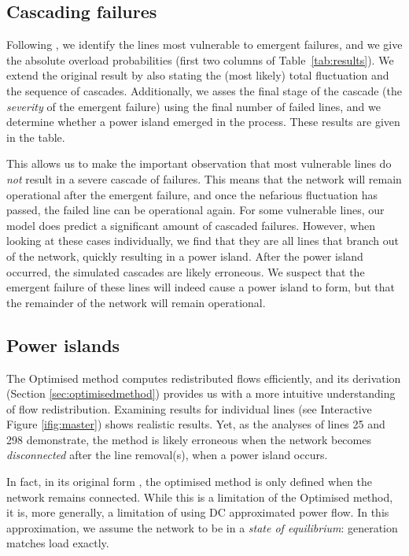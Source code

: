 \documentclass[main.tex]{subfiles}
\begin{document}
\subsection{Cascading failures}\label{sec:discussioncasc}
Following \cite{Nesti2018emergentfailures}, we identify the lines most vulnerable to emergent failures, and we give the absolute overload probabilities (first two columns of Table~\ref{tab:results}). We extend the original result by also stating the (most likely) total fluctuation and the sequence of cascades. Additionally, we asses the final stage of the cascade (\ie the \emph{severity} of the emergent failure) using the final number of failed lines, and we determine whether a power island emerged in the process. These results are given in the table.

This allows us to make the important observation that most vulnerable lines do \emph{not} result in a severe cascade of failures. This means that the network will remain operational after the emergent failure, and once the nefarious fluctuation has passed, the failed line can be operational again. For some vulnerable lines, our model does predict a significant amount of cascaded failures. However, when looking at these cases individually, we find that they are all lines that branch out of the network, quickly resulting in a power island. After the power island occurred, the simulated cascades are likely erroneous. We suspect that the emergent failure of these lines will indeed cause a power island to form, but that the remainder of the network will remain operational.

\subsection{Power islands}\label{sec:discussionpowerislands}
The Optimised method computes redistributed flows efficiently, and its derivation (Section \ref{sec:optimisedmethod}) provides us with a more intuitive understanding of flow redistribution. Examining results for individual lines (\eg see Interactive Figure \ref{ifig:master}) shows realistic results. Yet, as the analyses of lines 25 and 298 demonstrate, the method is likely erroneous when the network becomes \emph{disconnected} after the line removal(s), \ie when a power island occurs.

In fact, in its original form \citep{Ronellenfitsch2017}, the optimised method is only defined when the network remains connected.
While this is a limitation of the Optimised method, it is, more generally, a limitation of using DC approximated power flow. In this approximation, we assume the network to be in a \emph{state of equilibrium}: generation matches load exactly. 
\end{document}
